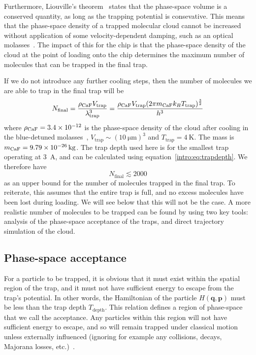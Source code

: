 Furthermore, Liouville's theorem~\cite{Landau1982, Hand1998} states that the
phase-space volume is a conserved quantity, as long as the trapping potential
is consevative. This means that the phase-space density of a trapped molecular
cloud cannot be increased without application of some velocity-dependent
damping, such as an optical molasses~\cite{Metcalf1999}. The impact of this for
the chip is that the phase-space density of the cloud at the point of loading
onto the chip determines the maximum number of molecules that can be trapped in
the final trap.

If we do not introduce any further cooling steps, then the number of molecules
we are able to trap in the final trap will be
%
\begin{equation}
  N_\text{final} = \frac{\rho_\text{CaF{}}V_\text{trap}}
  {\lambda_\text{trap}^3} = \frac{\rho_\text{CaF{}} V_\text{trap}(2 \pi m_\text{CaF} k_B
  T_\text{trap})^\frac{3}{2}}{h^3}
  \label{design:eq:psd_N}
\end{equation}
%
where $\rho_\text{CaF{}} = 3.4\times10^{-12}$ is the phase-space density of
the \CaF{} cloud after cooling in the blue-detuned molasses~\cite{Truppe2017},
$V_\text{trap}\sim(\SI{10}{\micro\meter})^3$ and
$T_\text{trap}=\SI{4}{\kelvin}$. The \CaF{} mass is
$m_\text{CaF{}}=\SI{9.79E-26}{\kilogram}$. The trap depth used here is for the
smallest trap operating at \SI{3}{\ampere}, and can be calculated using
equation~\ref{intro:eq:trapdepth}. We therefore have
%
\begin{equation}
  N_\text{final} \lesssim 2000
\end{equation}
%
as an upper bound for the number of molecules trapped in the final trap. To
reiterate, this assumes that the entire trap is full, and no excess molecules
have been lost during loading. We will see below that this will not be the
case. A more realistic number of molecules to be trapped can be found by using
two key tools: analysis of the phase-space acceptance of the traps, and direct
trajectory simulation of the cloud.

\subsection{Phase-space acceptance}


For a particle to be trapped, it is obvious that it must exist within the
spatial region of the trap, and it must not have sufficient energy to escape
from the trap's potential. In other words, the Hamiltonian of the particle
$H(\mathbf{q}, \mathbf{p})$ must be less than the trap depth $T_\text{depth}$.
This relation defines a region of phase-space that we call the
acceptance. Any particles within this region will not have sufficient
energy to escape, and so will remain trapped under classical motion unless
externally influenced (ignoring for example any collisions, decays, Majorana
losses, etc.)~\cite{Lichtenberg1969}.

